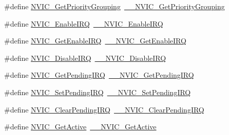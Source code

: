 \begin{DoxyCompactItemize}
\item 
\#define \hyperlink{group___c_m_s_i_s___core___n_v_i_c_functions_ga4eeb9214f2264fc23c34ad5de2d3fa11}{N\+V\+I\+C\+\_\+\+Get\+Priority\+Grouping}~\hyperlink{group___c_m_s_i_s___core___n_v_i_c_functions_ga9b894af672df4373eb637f8288845c05}{\+\_\+\+\_\+\+N\+V\+I\+C\+\_\+\+Get\+Priority\+Grouping}
\item 
\#define \hyperlink{group___c_m_s_i_s___core___n_v_i_c_functions_ga57b3064413dbc7459d9646020fdd8bef}{N\+V\+I\+C\+\_\+\+Enable\+I\+RQ}~\hyperlink{group___c_m_s_i_s___core___n_v_i_c_functions_ga71227e1376cde11eda03fcb62f1b33ea}{\+\_\+\+\_\+\+N\+V\+I\+C\+\_\+\+Enable\+I\+RQ}
\item 
\#define \hyperlink{group___c_m_s_i_s___core___n_v_i_c_functions_ga857de13232ec65dd15087eaa15bc4a69}{N\+V\+I\+C\+\_\+\+Get\+Enable\+I\+RQ}~\hyperlink{group___c_m_s_i_s___core___n_v_i_c_functions_gaaeb5e7cc0eaad4e2817272e7bf742083}{\+\_\+\+\_\+\+N\+V\+I\+C\+\_\+\+Get\+Enable\+I\+RQ}
\item 
\#define \hyperlink{group___c_m_s_i_s___core___n_v_i_c_functions_ga73b4e251f59cab4e9a5e234aac02ae57}{N\+V\+I\+C\+\_\+\+Disable\+I\+RQ}~\hyperlink{group___c_m_s_i_s___core___n_v_i_c_functions_gae016e4c1986312044ee768806537d52f}{\+\_\+\+\_\+\+N\+V\+I\+C\+\_\+\+Disable\+I\+RQ}
\item 
\#define \hyperlink{group___c_m_s_i_s___core___n_v_i_c_functions_gac608957a239466e9e0cbc30aa64feb3b}{N\+V\+I\+C\+\_\+\+Get\+Pending\+I\+RQ}~\hyperlink{group___c_m_s_i_s___core___n_v_i_c_functions_ga5a92ca5fa801ad7adb92be7257ab9694}{\+\_\+\+\_\+\+N\+V\+I\+C\+\_\+\+Get\+Pending\+I\+RQ}
\item 
\#define \hyperlink{group___c_m_s_i_s___core___n_v_i_c_functions_ga2b47e2e52cf5c48a5c3348636434b3ac}{N\+V\+I\+C\+\_\+\+Set\+Pending\+I\+RQ}~\hyperlink{group___c_m_s_i_s___core___n_v_i_c_functions_gaabefdd4b790b9a7308929938c0c1e1ad}{\+\_\+\+\_\+\+N\+V\+I\+C\+\_\+\+Set\+Pending\+I\+RQ}
\item 
\#define \hyperlink{group___c_m_s_i_s___core___n_v_i_c_functions_ga590cf113000a079b1f0ea3dcd5b5316c}{N\+V\+I\+C\+\_\+\+Clear\+Pending\+I\+RQ}~\hyperlink{group___c_m_s_i_s___core___n_v_i_c_functions_ga562a86dbdf14827d0fee8fdafb04d191}{\+\_\+\+\_\+\+N\+V\+I\+C\+\_\+\+Clear\+Pending\+I\+RQ}
\item 
\#define \hyperlink{group___c_m_s_i_s___core___n_v_i_c_functions_ga58ad3f352f832235ab3b192ff4745320}{N\+V\+I\+C\+\_\+\+Get\+Active}~\hyperlink{group___c_m_s_i_s___core___n_v_i_c_functions_gaa2837003c28c45abf193fe5e8d27f593}{\+\_\+\+\_\+\+N\+V\+I\+C\+\_\+\+Get\+Active}

\end{DoxyCompactItemize}
